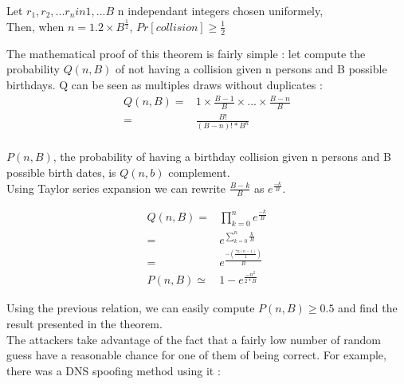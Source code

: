 \begin{mytheorem}
Let $r_1,r_2,...r_n in {1,...B}$ n independant integers chosen uniformely, \\
Then, when $n = 1.2\times B^{\frac{1}{2}}$, $Pr[collision] \geq \frac{1}{2} $
\end{mytheorem}

The mathematical proof of this theorem is fairly simple : let compute the probability $Q(n,B)$ of not having a collision given n persons and B possible birthdays. Q can be seen as multiples draws without duplicates : \\
\begin{align}
    Q(n,B) =& 1 \times \frac{B-1}{B} \times ... \times \frac{B-n}{B} \\
           =& \frac{B!}{(B-n)!*B^n} \\
\end{align}  

$P(n,B)$, the probability of having a birthday collision given n persons and B possible birth dates, is $Q(n,b)$ complement. \\
Using Taylor series expansion we can rewrite $\frac{B-k}{B}$ as $e^{\frac{-k}{B}}$. 

\begin{align}
    Q(n,B) =& \prod_{k = 0}^n e^{\frac{-k}{B}}      \\
           =& e^{\sum_{k = 0}^n \frac{k}{B}}        \\
           =& e^{ \frac{-(\frac{*n(n-1)}{2})}{B} }  \\
    P(n,B) \simeq& 1 - e^{ \frac{-n^2}{2*B} }       
\end{align}  


Using the previous relation, we can easily compute $P(n,B) \geq 0.5$ and find the result presented in the theorem.\\

The attackers take advantage of the fact that a fairly low number of random guess have a reasonable chance for one of them of being correct. For example, there was a DNS spoofing method using it : \\

